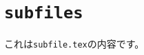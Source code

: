 \documentclass[main.tex]{subfiles}
\begin{document}
\section{\texttt{subfiles}}
これは\texttt{subfile.tex}の内容です。
\end{document}
